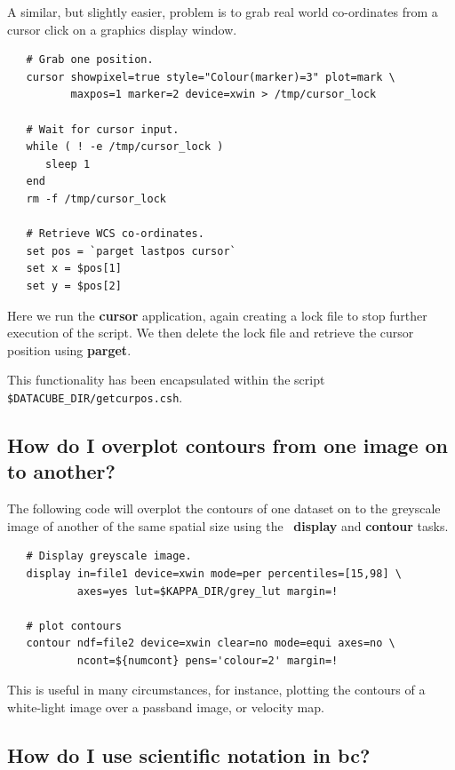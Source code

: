 \documentclass[twoside,11pt]{article}
\newcommand{\xref}[3]{#1}
\begin{document}
{A similar, but slightly easier, problem is to grab real world
co-ordinates from a cursor click on a graphics display window.

\small\begin{verbatim}
   # Grab one position.
   cursor showpixel=true style="Colour(marker)=3" plot=mark \
          maxpos=1 marker=2 device=xwin > /tmp/cursor_lock

   # Wait for cursor input.	  
   while ( ! -e /tmp/cursor_lock )
      sleep 1
   end
   rm -f /tmp/cursor_lock
   
   # Retrieve WCS co-ordinates.
   set pos = `parget lastpos cursor`
   set x = $pos[1]
   set y = $pos[2]
\end{verbatim}\normalsize

Here we run the \xref{{\bf cursor}}{sun95}{CURSOR} application, again
creating a lock file to stop further execution of the script.  We then
delete the lock file and retrieve the cursor position using
\xref{{\bf parget}}{sun95}{PARGET}.

This functionality has been encapsulated within the script
{\tt \$DATACUBE\_DIR/getcurpos.csh}.


\subsection{How do I overplot contours from one image on to another?}

The following code will overplot the contours of one dataset on to the
greyscale image of another of the same spatial size using the \KAPPA\ 
\xref{{\bf display}}{sun95}{DISPLAY} and \xref{{\bf contour}}{sun95}{CONTOUR}
tasks.

\small\begin{verbatim}
   # Display greyscale image.
   display in=file1 device=xwin mode=per percentiles=[15,98] \
           axes=yes lut=$KAPPA_DIR/grey_lut margin=! 
	   
   # plot contours
   contour ndf=file2 device=xwin clear=no mode=equi axes=no \
           ncont=${numcont} pens='colour=2' margin=! 
\end{verbatim}\normalsize

This is useful in many circumstances, for instance, plotting the
contours of a white-light image over a passband image, or velocity
map.

\subsection{How do I use scientific notation in {\bf bc}?}

}
\end{document}
